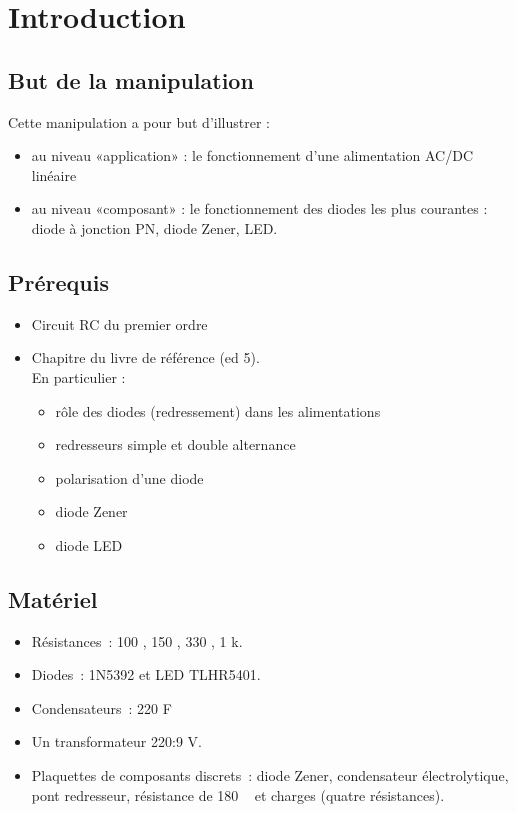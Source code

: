 \documentclass{../template/labo}
\author{The Fantastic Four}
\begin{document}

\section{Introduction}

\subsection{But de la manipulation}
Cette manipulation a pour but d'illustrer :
\begin{itemize}
\item au niveau «application» : le fonctionnement d'une alimentation AC/DC linéaire
\item au niveau «composant» : le fonctionnement des diodes les plus courantes : diode à jonction PN, diode Zener, LED.
\end{itemize}

\subsection{Prérequis}
\begin{itemize}
\item Circuit RC du premier ordre
\item Chapitre  du livre de référence (ed 5).\\ En particulier :
\begin{itemize}
\item rôle des diodes (redressement) dans les alimentations
\item redresseurs simple et double alternance
\item polarisation d'une diode
\item diode Zener
\item diode LED
\end{itemize}



\end{itemize}


\subsection{Matériel}
\begin{itemize}
\item Résistances~: 100 \ohm, 150 \ohm, 330 \ohm, 1 k\ohm.
\item Diodes~: 1N5392 et LED TLHR5401.
\item Condensateurs~: 220 \textmu F
\item Un transformateur 220:9 V.
\item Plaquettes de composants discrets~: diode Zener, condensateur électrolytique, pont redresseur, résistance de 180 \ohm~ et charges (quatre résistances).
\end{itemize}
\end{document}
